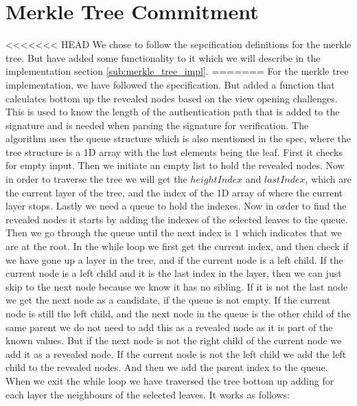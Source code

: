 \documentclass[twoside,11pt]{report}
\theoremstyle{definition}
\theoremstyle{plain}
\begin{document}
\section{Merkle Tree Commitment}
<<<<<<< HEAD
We chose to follow the sepcification definitions for the merkle tree. But have added some functionality to it which we will describe in the implementation section \autoref{sub:merkle_tree_impl}.
=======
For the merkle tree implementation, we have followed the specification. But added a function that calculates bottom up the revealed nodes based on the view opening challenges. This is used to know the length of the authentication path that is added to the signature and is needed when parsing the signature for verification. The algorithm uses the queue structure which is also mentioned in the spec, where the tree structure is a 1D array with the last elements being the leaf. First it checks for empty input. Then we initiate an empty list to hold the revealed nodes. Now in order to traverse the tree we will get the $heightIndex$ and $lastIndex$, which are the current layer of the tree, and the index of the 1D array of where the current layer stops. Lastly we need a queue to hold the indexes. Now in order to find the revealed nodes it starts by adding the indexes of the selected leaves to the queue. Then we go through the queue until the next index is $1$ which indicates that we are at the root. In the while loop we first get the current index, and then check if we have gone up a layer in the tree, and if the current node is a left child. If the current node is a left child and it is the last index in the layer, then we can just skip to the next node because we know it has no sibling. If it is not the last node we get the next node as a candidate, if the queue is not empty. If the current node is still the left child, and the next node in the queue is the other child of the same parent we do not need to add this as a revealed node as it is part of the known values. But if the next node is not the right child of the current node we add it as a revealed node. If the current node is not the left child we add the left child to the revealed nodes. And then we add the parent index to the queue. When we exit the while loop we have traversed the tree bottom up adding for each layer the neighbours of the selected leaves. It works as follows:
\end{document}

